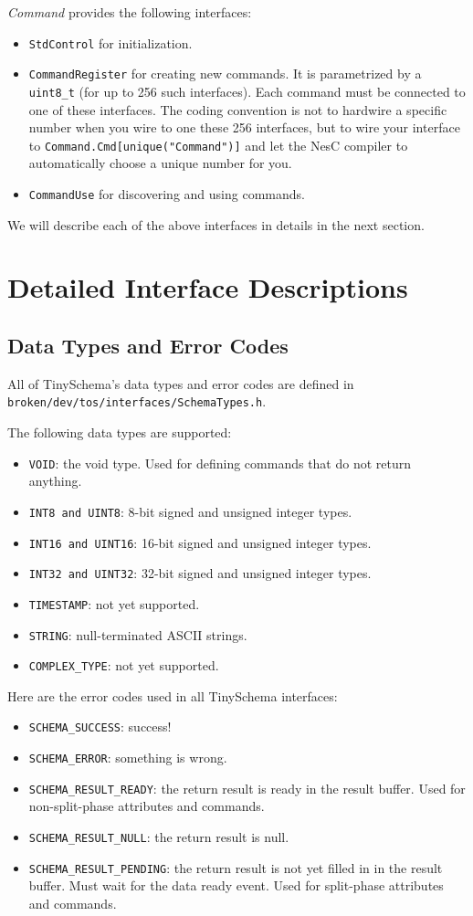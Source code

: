 \documentclass[11pt]{article}
\newcommand{\docroot}{broken/dev}
\begin{document}
{\em Command} provides the following interfaces:
\begin{itemize}
\item {\tt StdControl} for initialization.
\item {\tt CommandRegister} for creating new commands.  It is parametrized
by a {\tt uint8\_t} (for up to 256 such interfaces).  Each command must be connected to
one of these interfaces.  The coding convention is not
to hardwire a specific number when you wire to one these 256 interfaces, but
to wire your interface to {\tt Command.Cmd[unique("Command")]} and let
the NesC compiler to automatically choose a unique number for you.
\item {\tt CommandUse} for discovering and using commands.
\end{itemize}

We will describe each of the above interfaces in details in the next
section.

\section{Detailed Interface Descriptions}

\subsection{Data Types and Error Codes}
All of TinySchema's data types and error codes are defined in 
{\tt \docroot/tos/interfaces/SchemaTypes.h}.

The following data types are supported:
\begin{itemize}
\item {\tt VOID}: the void type.  Used for defining commands that do not
return anything.
\item {\tt INT8 and UINT8}: 8-bit signed and unsigned integer types.
\item {\tt INT16 and UINT16}: 16-bit signed and unsigned integer types.
\item {\tt INT32 and UINT32}: 32-bit signed and unsigned integer types.
\item {\tt TIMESTAMP}: not yet supported.
\item {\tt STRING}: null-terminated ASCII strings.
\item {\tt COMPLEX\_TYPE}: not yet supported.
\end{itemize}

Here are the error codes used in all TinySchema interfaces:
\begin{itemize}
\item {\tt SCHEMA\_SUCCESS}: success!
\item {\tt SCHEMA\_ERROR}: something is wrong.
\item {\tt SCHEMA\_RESULT\_READY}: the return result is ready in the result
buffer.  Used for non-split-phase attributes and commands.
\item {\tt SCHEMA\_RESULT\_NULL}: the return result is null.
\item {\tt SCHEMA\_RESULT\_PENDING}: the return result is not yet filled in in the
result buffer.  Must wait for the data ready event.  Used for split-phase
attributes and commands.
\end{itemize}
\end{document}
